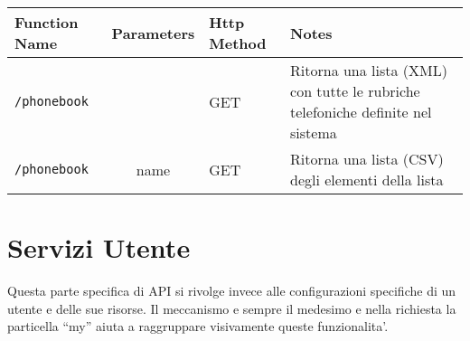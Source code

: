 


\bigskip

\begin{tabular}[c]{l | c || l || p{5cm}}
Function Name & Parameters & Http Method & Notes \\
\hline \hline
\texttt{/phonebook} & & GET & Ritorna una lista (XML) con tutte le rubriche telefoniche definite nel sistema \\
\hline 
\texttt{/phonebook} & {name} & GET  & Ritorna una lista (CSV) degli elementi della lista \\
\hline
\end{tabular}

\section{Servizi Utente}

Questa parte specifica di API si rivolge invece alle configurazioni specifiche di un utente e delle sue risorse.
Il meccanismo e sempre il medesimo e nella richiesta la particella ``my'' aiuta a raggruppare visivamente queste funzionalita'.
\bigskip

